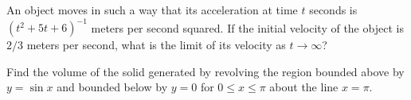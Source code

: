 \documentclass{ximera}
\begin{document}
\begin{question}%

An object moves in such a way that its acceleration at time \(t\) seconds is \((t^2 + 5t + 6)^{-1}\) meters per second squared. If the initial velocity of the object is \(2/3\) meters per second, what is the limit of its velocity as \(t \rightarrow \infty\)?
\begin{multiplechoice}
\end{multiplechoice}

\end{question}

\begin{question}%

Find the volume of the solid generated by revolving the region bounded above by \(y = \sin x\) and bounded below by \(y = 0\) for \(0 \leq x \leq \pi\) about the line \(x = \pi\).
\begin{multiplechoice}
\end{multiplechoice}

\end{question}
\end{document}
